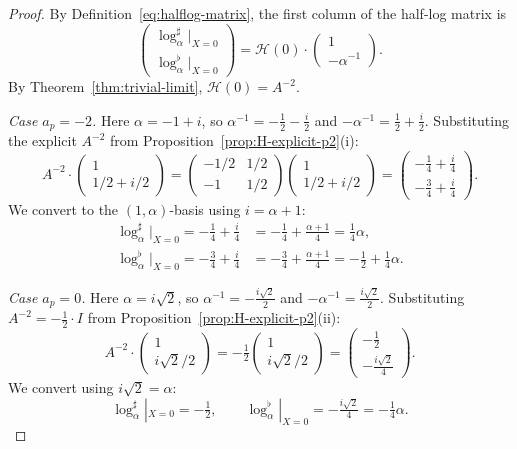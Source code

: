 \documentclass[11pt,a4paper]{amsart}
\theoremstyle{definition}
\newcommand{\Hcal}{\mathcal{H}}
\begin{document}
\begin{proof}
By Definition~\ref{eq:halflog-matrix}, the first column of the half-log matrix is
\[
\begin{pmatrix} \log_\alpha^\sharp|_{X=0} \\ \log_\alpha^\flat|_{X=0} \end{pmatrix} = \Hcal(0) \cdot \begin{pmatrix} 1 \\ -\alpha^{-1} \end{pmatrix}.
\]
By Theorem~\ref{thm:trivial-limit}, $\Hcal(0) = A^{-2}$.

\smallskip
\noindent\emph{Case $a_p = -2$.} Here $\alpha = -1 + i$, so $\alpha^{-1} = -\tfrac{1}{2} - \tfrac{i}{2}$ and $-\alpha^{-1} = \tfrac{1}{2} + \tfrac{i}{2}$. Substituting the explicit $A^{-2}$ from Proposition~\ref{prop:H-explicit-p2}(i):
\[
A^{-2} \cdot \begin{pmatrix} 1 \\ 1/2 + i/2 \end{pmatrix}
= \begin{pmatrix} -1/2 & 1/2 \\ -1 & 1/2 \end{pmatrix} \begin{pmatrix} 1 \\ 1/2 + i/2 \end{pmatrix}
= \begin{pmatrix} -\tfrac{1}{4} + \tfrac{i}{4} \\ -\tfrac{3}{4} + \tfrac{i}{4} \end{pmatrix}.
\]
We convert to the $(1, \alpha)$-basis using $i = \alpha + 1$:
\begin{align*}
\log_\alpha^\sharp|_{X=0} = -\tfrac{1}{4} + \tfrac{i}{4} &= -\tfrac{1}{4} + \tfrac{\alpha + 1}{4} = \tfrac{1}{4}\alpha, \\
\log_\alpha^\flat|_{X=0} = -\tfrac{3}{4} + \tfrac{i}{4} &= -\tfrac{3}{4} + \tfrac{\alpha + 1}{4} = -\tfrac{1}{2} + \tfrac{1}{4}\alpha.
\end{align*}

\smallskip
\noindent\emph{Case $a_p = 0$.} Here $\alpha = i\sqrt{2}$, so $\alpha^{-1} = -\tfrac{i\sqrt{2}}{2}$ and $-\alpha^{-1} = \tfrac{i\sqrt{2}}{2}$. Substituting $A^{-2} = -\tfrac{1}{2} \cdot I$ from Proposition~\ref{prop:H-explicit-p2}(ii):
\[
A^{-2} \cdot \begin{pmatrix} 1 \\ i\sqrt{2}/2 \end{pmatrix}
= -\tfrac{1}{2} \begin{pmatrix} 1 \\ i\sqrt{2}/2 \end{pmatrix}
= \begin{pmatrix} -\tfrac{1}{2} \\ -\tfrac{i\sqrt{2}}{4} \end{pmatrix}.
\]
We convert using $i\sqrt{2} = \alpha$:
\[
\log_\alpha^\sharp|_{X=0} = -\tfrac{1}{2}, \qquad
\log_\alpha^\flat|_{X=0} = -\tfrac{i\sqrt{2}}{4} = -\tfrac{1}{4}\alpha.
\]


\end{proof}
\end{document}
